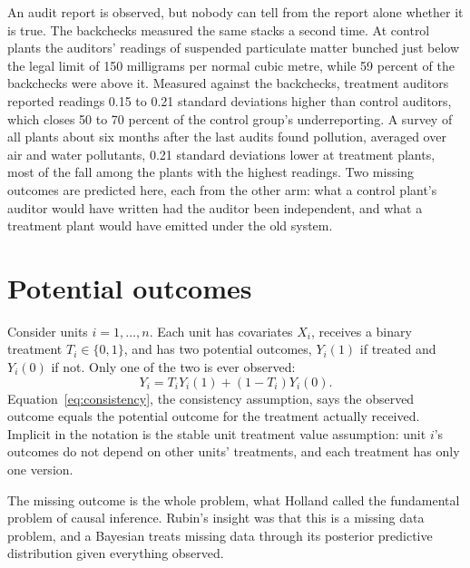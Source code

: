 An audit report is observed, but nobody can tell from the report alone whether it is true. The backchecks measured the same stacks a second time. At control plants the auditors' readings of suspended particulate matter bunched just below the legal limit of 150 milligrams per normal cubic metre, while 59 percent of the backchecks were above it. Measured against the backchecks, treatment auditors reported readings 0.15 to 0.21 standard deviations higher than control auditors, which closes 50 to 70 percent of the control group's underreporting. A survey of all plants about six months after the last audits found pollution, averaged over air and water pollutants, 0.21 standard deviations lower at treatment plants, most of the fall among the plants with the highest readings. Two missing outcomes are predicted here, each from the other arm: what a control plant's auditor would have written had the auditor been independent, and what a treatment plant would have emitted under the old system.

\section{Potential outcomes}\label{sec:potential}

Consider units $i = 1, \ldots, n$. Each unit has covariates $X_i$, receives a binary treatment $T_i \in \{0,1\}$, and has two potential outcomes, $Y_i(1)$ if treated and $Y_i(0)$ if not. Only one of the two is ever observed:
\begin{equation}
Y_i = T_i Y_i(1) + (1 - T_i) Y_i(0).
\label{eq:consistency}
\end{equation}
Equation~\eqref{eq:consistency}, the consistency assumption, says the observed outcome equals the potential outcome for the treatment actually received. Implicit in the notation is the stable unit treatment value assumption: unit $i$'s outcomes do not depend on other units' treatments, and each treatment has only one version.

The missing outcome is the whole problem, what Holland called the fundamental problem of causal inference. Rubin's insight was that this is a missing data problem, and a Bayesian treats missing data through its posterior predictive distribution given everything observed.


